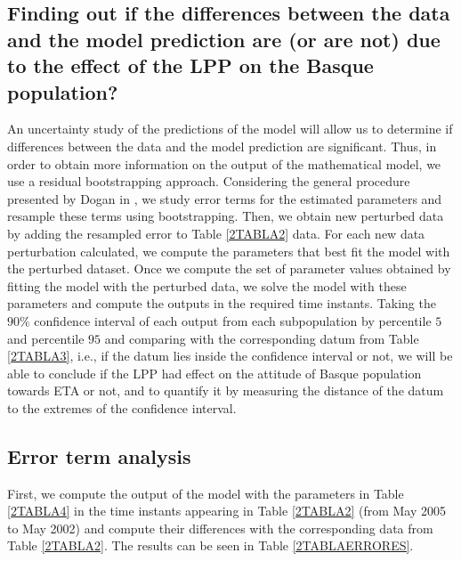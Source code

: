 \subsection{Finding out if the differences between the data and the model prediction are (or are not) due to the effect of the LPP on the Basque population?}
An uncertainty study of the predictions of the model will allow us to determine if differences between the data and the model prediction are significant. Thus, in order to obtain more information on the output of the mathematical model, we use a residual bootstrapping approach. Considering the general procedure presented by Dogan in \cite{Dogan}, we study error terms for the estimated parameters and resample these terms using bootstrapping. Then, we obtain new perturbed data by adding the resampled error to Table \ref{2TABLA2} data. For each new data perturbation calculated, we compute the parameters that best fit the model with the perturbed dataset. Once we compute the set of parameter values obtained by fitting the model with the perturbed data, we solve the model with these parameters and compute the outputs in the required time instants. Taking the $90\%$ confidence interval of each output from each subpopulation by percentile $5$ and percentile $95$ and comparing with the corresponding datum from Table \ref{2TABLA3}, i.e., if the datum lies inside the confidence interval or not, we will be able to conclude if the LPP had effect on the attitude of Basque population towards ETA or not, and to quantify it by measuring the distance of the datum to the extremes of the confidence interval.

\subsection{Error term analysis}   
First, we compute the output of the model with the parameters in Table \ref{2TABLA4} in the time instants appearing in Table \ref{2TABLA2} (from May 2005 to May 2002) and compute their differences with the corresponding data from Table \ref{2TABLA2}. The results can be seen in Table \ref{2TABLAERRORES}.

